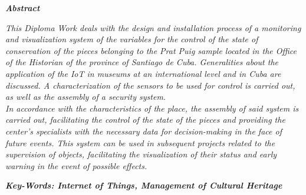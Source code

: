 \setcounter{page}{5}
\thispagestyle{plain}

    \textbf{\textit{\LARGE Abstract}}
    \newline

    \textit{This Diploma Work deals with the design and installation process of a monitoring and visualization system of the variables for the control of the state of conservation of the pieces belonging to the Prat Puig sample located in the Office of the Historian of the province of Santiago de Cuba. Generalities about the application of the IoT in museums at an international level and in Cuba are discussed. A characterization of the sensors to be used for control is carried out, as well as the assembly of a security system.\\
    In accordance with the characteristics of the place, the assembly of said system is carried out, facilitating the control of the state of the pieces and providing the center's specialists with the necessary data for decision-making in the face of future events. This system can be used in subsequent projects related to the supervision of objects, facilitating the visualization of their status and early warning in the event of possible effects.}


    \textbf{\textit{Key-Words: Internet of Things, Management of Cultural Heritage}} 